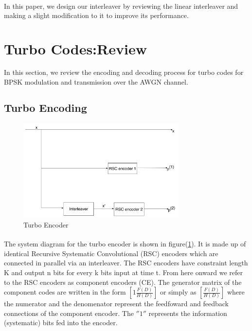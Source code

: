 \documentclass[20 pts]{article}
\begin{document}
\paragraph{}
In this paper, we design our interleaver by reviewing the linear interleaver and making
a slight modification to it to improve its performance.

\section{Turbo Codes:Review}
In this section, we review the encoding and decoding process for turbo codes for BPSK
modulation and transmission over the AWGN channel.
	
\subsection{Turbo Encoding}

\begin{figure}[h!]
\centering
		\includegraphics[width=0.75\textwidth]{TurboEncoder.pdf}
		\caption{Turbo Encoder}
		\label{TC}
		\end{figure}
	
\paragraph{}The system diagram for the turbo encoder is shown in figure(\ref{TC}).
 It is made up of identical Recursive Systematic Convolutional (RSC) encoders which 
 are connected
  in parallel via an interleaver. The RSC encoders have constraint length K and output
  n bits for every k bits input at time t.
  From here onward we refer to the RSC encoders as component 
encoders (CE). The generator matrix of the component codes are written in 
the form $[1 \frac{F(D)}{H(D)}]$ or simply as $[\frac{F(D)}{H(D)}]$
where the numerator and the denomenator represent the feedfoward and feedback
 connections of the component encoder. The $''1''$ represents the information 
 (systematic) bits fed into the encoder.
\end{document}
